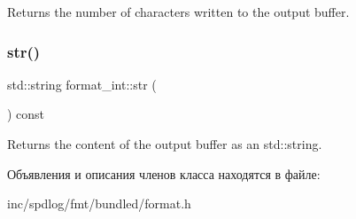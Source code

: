 Returns the number of characters written to the output buffer. \mbox{\label{classformat__int_ab14204962423d35a320f15e673b08e06}} 
\subsubsection{\texorpdfstring{str()}{str()}}
{\footnotesize\ttfamily std\+::string format\+\_\+int\+::str (\begin{DoxyParamCaption}{ }\end{DoxyParamCaption}) const\hspace{0.3cm}{\ttfamily [inline]}}

Returns the content of the output buffer as an {\ttfamily std\+::string}.  

Объявления и описания членов класса находятся в файле\+:\begin{DoxyCompactItemize}
\item 
inc/spdlog/fmt/bundled/format.\+h\end{DoxyCompactItemize}
